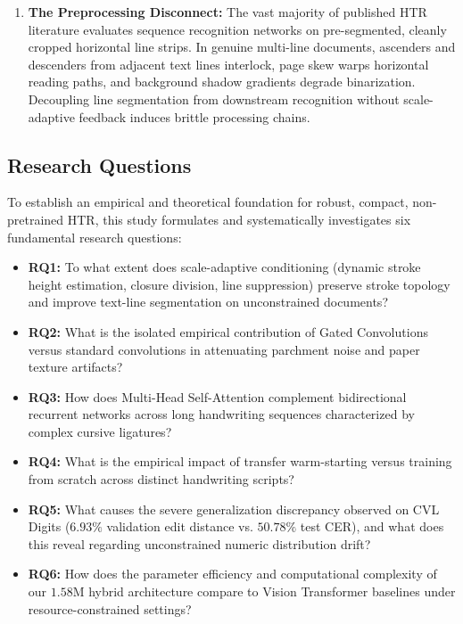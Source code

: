 \documentclass{IEEEtran}
\begin{document}
\begin{enumerate}
    \item \textbf{The Preprocessing Disconnect:} The vast majority of published HTR literature evaluates sequence recognition networks on pre-segmented, cleanly cropped horizontal line strips. In genuine multi-line documents, ascenders and descenders from adjacent text lines interlock, page skew warps horizontal reading paths, and background shadow gradients degrade binarization. Decoupling line segmentation from downstream recognition without scale-adaptive feedback induces brittle processing chains.

\end{enumerate}

\subsection{Research Questions}

To establish an empirical and theoretical foundation for robust, compact, non-pretrained HTR, this study formulates and systematically investigates six fundamental research questions:

\begin{itemize}

    \item \textbf{RQ1:} To what extent does scale-adaptive conditioning (dynamic stroke height estimation, closure division, line suppression) preserve stroke topology and improve text-line segmentation on unconstrained documents?

    \item \textbf{RQ2:} What is the isolated empirical contribution of Gated Convolutions versus standard convolutions in attenuating parchment noise and paper texture artifacts?

    \item \textbf{RQ3:} How does Multi-Head Self-Attention complement bidirectional recurrent networks across long handwriting sequences characterized by complex cursive ligatures?

    \item \textbf{RQ4:} What is the empirical impact of transfer warm-starting versus training from scratch across distinct handwriting scripts?

    \item \textbf{RQ5:} What causes the severe generalization discrepancy observed on CVL Digits ($6.93\%$ validation edit distance vs. $50.78\%$ test CER), and what does this reveal regarding unconstrained numeric distribution drift?

    \item \textbf{RQ6:} How does the parameter efficiency and computational complexity of our $1.58\text{M}$ hybrid architecture compare to Vision Transformer baselines under resource-constrained settings?

\end{itemize}
\end{document}
